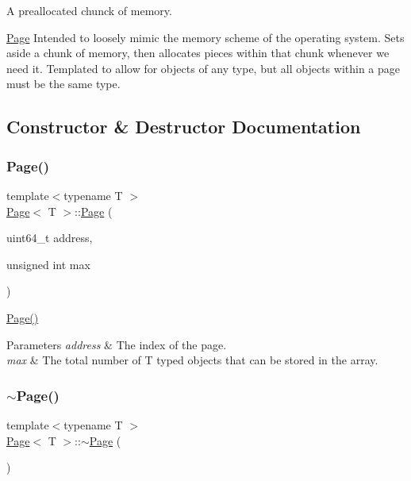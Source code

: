A preallocated chunck of memory. 

\hyperlink{class_page}{Page} Intended to loosely mimic the memory scheme of the operating system. Sets aside a chunk of memory, then allocates pieces within that chunk whenever we need it. Templated to allow for objects of any type, but all objects within a page must be the same type. 

\subsection{Constructor \& Destructor Documentation}
\mbox{\label{class_page_ac9e22e2694dfa6a7dc4f80166c0217c5}} 
\subsubsection{\texorpdfstring{Page()}{Page()}}
{\footnotesize\ttfamily template$<$typename T $>$ \\
\hyperlink{class_page}{Page}$<$ T $>$\+::\hyperlink{class_page}{Page} (\begin{DoxyParamCaption}\item[{uint64\+\_\+t}]{address,  }\item[{unsigned int}]{max }\end{DoxyParamCaption})}

\hyperlink{class_page_ac9e22e2694dfa6a7dc4f80166c0217c5}{Page()} 
\begin{DoxyParams}{Parameters}
{\em address} & The index of the page. \\
\hline
{\em max} & The total number of T typed objects that can be stored in the array. \\
\hline
\end{DoxyParams}
\mbox{\label{class_page_a7312a131c7f52718cf4f2b6f487d31bf}} 
\subsubsection{\texorpdfstring{$\sim$\+Page()}{~Page()}}
{\footnotesize\ttfamily template$<$typename T $>$ \\
\hyperlink{class_page}{Page}$<$ T $>$\+::$\sim$\hyperlink{class_page}{Page} (\begin{DoxyParamCaption}{ }\end{DoxyParamCaption})}

